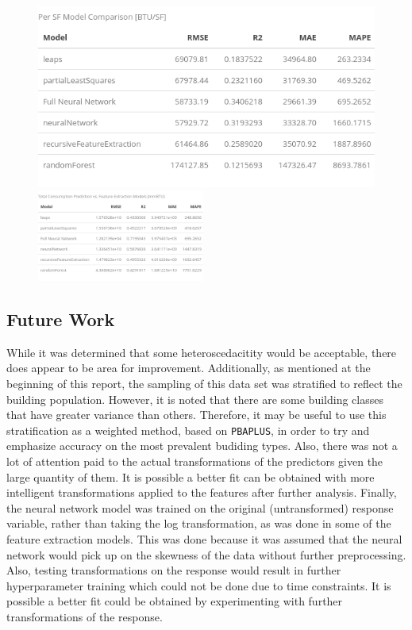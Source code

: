 \begin{figure}[h]
\centering
\includegraphics[width=.49\textwidth, height=0.25\textheight]{Images/natural_gas_psf_model_summary.png}
\includegraphics[width=0.49\textwidth, height=0.25\textheight]{Images/natural_gas_psf_model_summary_transformed.png}
\end{figure}

\subsection{Future Work}
While it was determined that some heteroscedacitity would be acceptable, there does appear to be area for improvement.  Additionally, as mentioned at the beginning of this report, the sampling of this data set was stratified to reflect the building population.  However, it is noted that there are some building classes that have greater variance than others.  Therefore, it may be useful to use this stratification as a weighted method, based on \lstinline{PBAPLUS}, in order to try and emphasize accuracy on the most prevalent budiding types. Also, there was not a lot of attention paid to the actual transformations of the predictors given the large quantity of them.  It is possible a better fit can be obtained with more intelligent transformations applied to the features after further analysis.  Finally, the neural network model was trained on the original (untransformed) response variable, rather than taking the log transformation, as was done in some of the feature extraction models.  This was done because it was assumed that the neural network would pick up on the skewness of the data without further preprocessing.  Also, testing transformations on the response would result in further hyperparameter training which could not be done due to time constraints.  It is possible a better fit could be obtained by experimenting with further transformations of the response.


